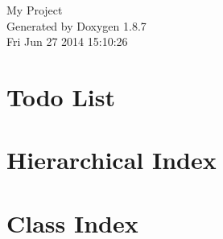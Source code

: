 \documentclass[twoside]{book}
\newcommand{\+}{\discretionary{\mbox{\scriptsize$\hookleftarrow$}}{}{}}
\newcommand{\clearemptydoublepage}{%
  \newpage{\pagestyle{empty}\cleardoublepage}%
}
\begin{document}
\hypersetup{pageanchor=false,
             bookmarks=true,
             bookmarksnumbered=true,
             pdfencoding=unicode
            }
\begin{titlepage}
\vspace*{7cm}
\begin{center}%
{\Large My Project }\\
\vspace*{1cm}
{\large Generated by Doxygen 1.8.7}\\
\vspace*{0.5cm}
{\small Fri Jun 27 2014 15:10:26}\\
\end{center}
\end{titlepage}
\clearemptydoublepage
\tableofcontents
\clearemptydoublepage
{}
\hypersetup{pageanchor=true}

\chapter{Todo List}
\label{todo}
\hypertarget{todo}{}

\chapter{Hierarchical Index}

\chapter{Class Index}

\end{document}
